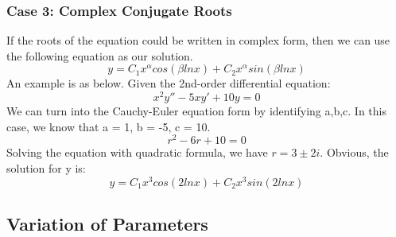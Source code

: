 \documentclass{article}
\begin{document}
\subsubsection{Case 3: Complex Conjugate Roots}
If the roots of the equation could be written in complex form, then we can use the following equation as our solution.
\begin{equation*}
y = C_1x^{\alpha}cos(\beta lnx)+C_2x^{\alpha}sin(\beta lnx)
\end{equation*}
An example is as below. Given the 2nd-order differential equation:
\begin{equation*}
	x^2y''-5xy'+10y=0
\end{equation*}
We can turn into the Cauchy-Euler equation form by identifying a,b,c. In this case, we know that a = 1, b = -5, c = 10.
\begin{equation*}
	r^2-6r+10=0
\end{equation*}
Solving the equation with quadratic formula, we have $r = 3 \pm 2i$. Obvious, the solution for y is:
\begin{equation*}
	y = C_1x^3cos(2lnx) + C_2x^3sin(2lnx)
\end{equation*}
\subsection{Variation of Parameters}
\end{document}
